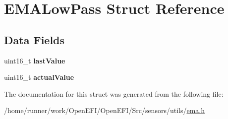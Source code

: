 \hypertarget{structEMALowPass}{}\section{E\+M\+A\+Low\+Pass Struct Reference}
\label{structEMALowPass}
\subsection*{Data Fields}
\begin{DoxyCompactItemize}
\item 
\mbox{\label{structEMALowPass_a73f50a2d936f1cb4f1fbdd7e71fce863}} 
uint16\+\_\+t {\bfseries last\+Value}
\item 
\mbox{\label{structEMALowPass_a7747b0ecc32c8720e49bb2ca9247735b}} 
uint16\+\_\+t {\bfseries actual\+Value}
\end{DoxyCompactItemize}


The documentation for this struct was generated from the following file\+:\begin{DoxyCompactItemize}
\item 
/home/runner/work/\+Open\+E\+F\+I/\+Open\+E\+F\+I/\+Src/sensors/utils/\hyperlink{ema_8h}{ema.\+h}\end{DoxyCompactItemize}
